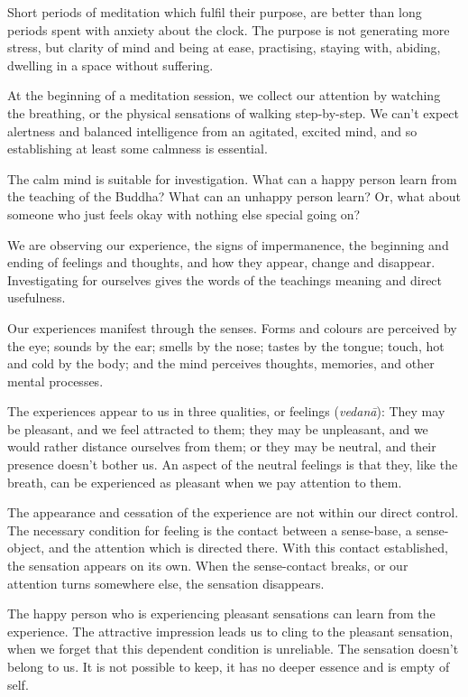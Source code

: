 Short periods of meditation which fulfil their purpose, are better than
long periods spent with anxiety about the clock. The purpose is not
generating more stress, but clarity of mind and being at ease,
practising, staying with, abiding, dwelling in a space without
suffering.


At the beginning of a meditation session, we collect our attention by
watching the breathing, or the physical sensations of walking
step-by-step. We can't expect alertness and balanced intelligence from
an agitated, excited mind, and so establishing at least some calmness is
essential.

The calm mind is suitable for investigation. What can a happy person
learn from the teaching of the Buddha? What can an unhappy person learn?
Or, what about someone who just feels okay with nothing else special
going on?

We are observing our experience, the signs of impermanence, the
beginning and ending of feelings and thoughts, and how they appear,
change and disappear. Investigating for ourselves gives the words of the
teachings meaning and direct usefulness.

Our experiences manifest through the senses. Forms and colours are
perceived by the eye; sounds by the ear; smells by the nose; tastes by
the tongue; touch, hot and cold by the body; and the mind perceives
thoughts, memories, and other mental processes.


The experiences appear to us in three qualities, or feelings
(\emph{vedanā}): They may be pleasant, and we feel attracted to them;
they may be unpleasant, and we would rather distance ourselves from
them; or they may be neutral, and their presence doesn't bother us. An
aspect of the neutral feelings is that they, like the breath, can be
experienced as pleasant when we pay attention to them.

The appearance and cessation of the experience are not within our direct
control. The necessary condition for feeling is the contact between a
sense-base, a sense-object, and the attention which is directed there.
With this contact established, the sensation appears on its own. When
the sense-contact breaks, or our attention turns somewhere else, the
sensation disappears.

The happy person who is experiencing pleasant sensations can learn from
the experience. The attractive impression leads us to cling to the
pleasant sensation, when we forget that this dependent condition is
unreliable. The sensation doesn't belong to us. It is not possible to
keep, it has no deeper essence and is empty of self.

